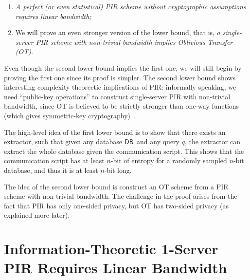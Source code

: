 \begin{enumerate}
    \item \textit{A perfect (or even statistical) PIR scheme without cryptographic assumptions requires linear bandwidth;}
    \item We will prove an even stronger version of the lower bound, that is, 
\textit{a single-server PIR scheme with non-trivial bandwidth implies Oblivious Transfer (OT)}.
\end{enumerate}

Even though the second lower bound implies the first one,
we will still begin by proving the first one since its proof is simpler. 
The second lower bound shows interesting 
complexity theorectic implications of PIR: informally speaking,
we need ``public-key operations'' to construct single-server PIR with 
non-trivial bandwidth, since OT is believed to be strictly stronger
than one-way functions (which gives symmetric-key cryptography)~\cite{IR89}.

The high-level idea of the first lower bound is to show that there exists an extractor, such that given any database ${\sf DB}$ and any query $q$, the extractor can extract the whole database given the communication script.
This shows that the communication script has at least $n$-bit of entropy for a  
randomly sampled $n$-bit database, 
and thus it is at least $n$-bit long. 

The idea of the second lower bound is construct an OT  
scheme from a PIR scheme 
with non-trivial bandwidth.
The challenge in the proof arises from the fact that PIR has only one-sided
privacy, but OT has two-sided privacy (as explained more later).







\section{Information-Theoretic 1-Server PIR Requires Linear Bandwidth}

